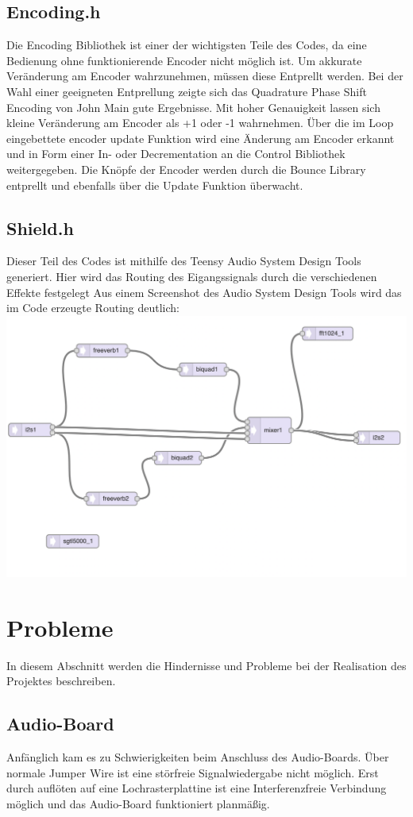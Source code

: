 \documentclass[12pt]{article}
\begin{document}
\subsection{Encoding.h}
Die Encoding Bibliothek ist einer der wichtigsten Teile des Codes, da eine Bedienung ohne funktionierende Encoder nicht möglich ist. Um akkurate Veränderung am Encoder wahrzunehmen, 
müssen diese Entprellt werden. Bei der Wahl einer geeigneten Entprellung zeigte sich das Quadrature Phase Shift Encoding von John Main gute Ergebnisse. Mit hoher Genauigkeit lassen sich 
kleine Veränderung am Encoder als +1 oder -1 wahrnehmen. Über die im Loop eingebettete encoder update Funktion wird eine Änderung am Encoder erkannt und in Form einer In- oder Decrementation an die Control 
Bibliothek weitergegeben. Die Knöpfe der Encoder werden durch die Bounce Library entprellt und ebenfalls über die Update Funktion überwacht.   
\subsection{Shield.h}
Dieser Teil des Codes ist mithilfe des Teensy Audio System Design Tools generiert. Hier wird das Routing des Eigangssignals durch die verschiedenen Effekte festgelegt 
Aus einem Screenshot des Audio System Design Tools wird das im Code erzeugte Routing deutlich:
\\
\includegraphics[width=\textwidth]{AudioDesignTool}

\newpage
\section{Probleme}
In diesem Abschnitt werden die Hindernisse und Probleme bei der Realisation des Projektes beschreiben.
\subsection{Audio-Board}
Anfänglich kam es zu Schwierigkeiten beim Anschluss des Audio-Boards. Über normale Jumper Wire ist eine störfreie Signalwiedergabe nicht möglich. 
Erst durch auflöten auf eine Lochrasterplattine ist eine Interferenzfreie Verbindung möglich und das Audio-Board funktioniert planmäßig.
\end{document}
